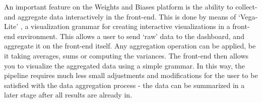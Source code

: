 \documentclass[../main.tex]{subfiles}
\begin{document}
An important feature on the Weights and Biases platform is the ability to collect- and aggregate data interactively in the front-end. This is done by means of `Vega-Lite' \citep{satyanarayan_vega-lite_2017}, a visualization grammar for creating interactive visualizations in a front-end environment. This allows a user to send `raw' data to the dashboard, and aggregate it on the front-end itself. Any aggregation operation can be applied, be it taking averages, sums or computing the variances. The front-end then allows you to visualize the aggregated data using a simple grammar. In this way, the pipeline requires much less small adjustments and modifications for the user to be satisfied with the data aggregation process - the data can be summarized in a later stage after all results are already in.



\biblio
\end{document}
